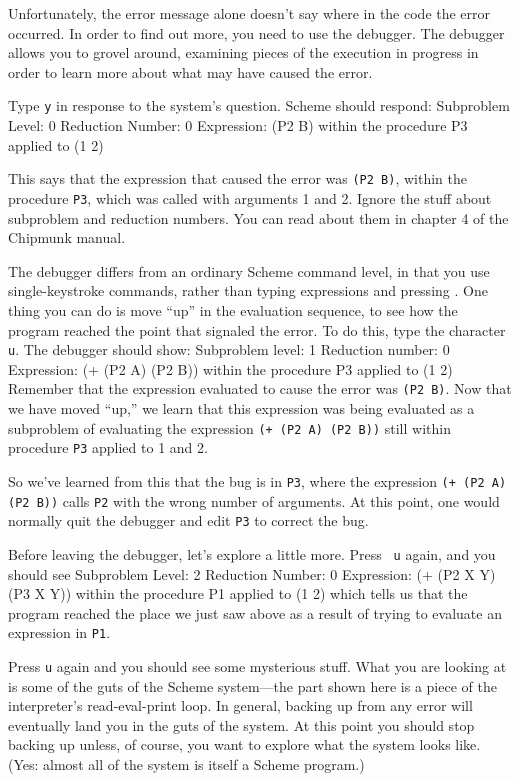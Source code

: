 Unfortunately, the error message alone doesn't say where in the code
the error occurred.  In order to find out more, you need to use the
debugger.  The debugger allows you to grovel around, examining pieces
of the execution in progress in order to learn more about what may
have caused the error.

Type {\tt y} in response to the system's question.
Scheme should respond:
\beginlisp
Subproblem Level: 0  Reduction Number: 0
Expression:
(P2 B)
within the procedure P3
applied to (1 2)
\endlisp

This says that the expression that caused the error was {\tt (P2 B)},
within the procedure {\tt P3}, which was called with arguments 1 and
2.  Ignore the stuff about subproblem and reduction numbers.  You can
read about them in chapter 4 of the Chipmunk manual.

The debugger differs from an ordinary Scheme command level, in that
you use single-keystroke commands, rather than typing expressions and
pressing .  One thing you can do is move ``up'' in the
evaluation sequence, to see how the program reached the point that
signaled the error.  To do this, type the character {\tt u}.  The
debugger should show:
\beginlisp
Subproblem level: 1 Reduction number: 0
Expression:
(+ (P2 A) (P2 B))
within the procedure P3
applied to (1 2)
\endlisp
Remember that the expression evaluated to cause the error was {\tt (P2
B)}.  Now that we have moved ``up,'' we learn that this expression was
being evaluated as a subproblem of evaluating the expression {\tt (+
(P2 A) (P2 B))} still within procedure {\tt P3} applied to 1 and 2.

So we've learned from this that the bug is in {\tt P3}, where the
expression {\tt (+ (P2 A) (P2 B))} calls {\tt P2} with the wrong
number of arguments.  At this point, one would normally quit the
debugger and edit {\tt P3} to correct the bug.

Before leaving the debugger, let's explore a little more.  Press {\tt
u} again, and you should see
\beginlisp
Subproblem Level: 2  Reduction Number: 0
Expression:
(+ (P2 X Y) (P3 X Y))
within the procedure P1
applied to (1 2)
\endlisp
which tells us that the program reached the place we just saw above as
a result of trying to evaluate an expression in {\tt P1}.

Press {\tt u} again and you should see some mysterious stuff.  What
you are looking at is some of the guts of the Scheme system---the part
shown here is a piece of the interpreter's read-eval-print loop.
In general, backing up from any error will eventually land you in the
guts of the system.  At this point you should stop backing up unless,
of course, you want to explore what the system looks like.  (Yes:
almost all of the system is itself a Scheme program.)

